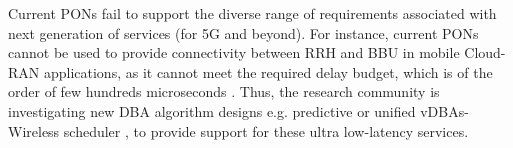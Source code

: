 Current \acp{PON} fail to support the diverse range of requirements associated with next generation of services (for 5G and beyond). For instance, current \acp{PON} cannot be used to provide connectivity between \ac{RRH} and \ac{BBU} in mobile Cloud-RAN applications, as it cannot meet the required delay budget, which is of the order of few hundreds microseconds \cite{Zhou:18}. %
Thus, the research community is investigating new \ac{DBA} algorithm designs e.g. predictive \cite{8289443} or unified \acp{vDBA}-Wireless scheduler \cite{Zhou:18}, to provide support for these ultra low-latency services.









